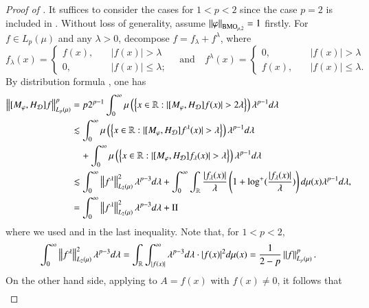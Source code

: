 \documentclass[leqno]{amsart}
\begin{document}
\begin{proof}[Proof of ]
 It suffices to consider the cases for $1<p<2$ since the case $p=2$ is included in . Without loss of generality, assume $\left\| \varphi \right\|_{{\rm BMO}_{\mu,2}}=1$ firstly. For $f\in L_{p}(\mu)$ and any $\lambda>0$, decompose $f=f_{\lambda}+f^{\lambda}$, where
\begin{equation*}
f_{\lambda}(x)=\left\{
\begin{aligned}
f(x),\quad&|f(x)|>\lambda\\
0,\quad&|f(x)|\leq\lambda;
\end{aligned}
\right.
\quad\mbox{and}\quad
f^{\lambda}(x)=\left\{
\begin{aligned}
0,\quad&|f(x)|>\lambda\\
f(x),\quad&|f(x)|\leq\lambda.
\end{aligned}
\right.
\end{equation*}
By distribution formula \cite[Proposition 1.1.4]{Gr-book1}, one has
\begin{align*}
\Norm{[M_{\varphi},H_{\D}]f}_{L_{p}(\mu)}^{p}
&=p2^{p-1}\int_{0}^{\infty}\mu\left(\set{x\in\RR:|[M_{\varphi},H_{\D}]f(x)|>2\lambda}\right)
\lambda^{p-1}d\lambda\\
&\lesssim\int_{0}^{\infty}\mu\left(\set{x\in\RR:|[M_{\varphi},H_{\D}]f^{\lambda}(x)|>\lambda}\right)
\lambda^{p-1}d\lambda\\
&\quad+\int_{0}^{\infty}\mu\left(\set{x\in\RR:|[M_{\varphi},H_{\D}]f_{\lambda}(x)|>\lambda}\right)
\lambda^{p-1}d\lambda\\
&\lesssim\int_{0}^{\infty}\Norm{f^{\lambda}}_{L_{2}(\mu)}^{2}\lambda^{p-3}d\lambda
+\int_{0}^{\infty}\int_{\RR}\frac{|f_{\lambda}(x)|}{\lambda}\left(1+\log^{+}(\frac{|f_{\lambda}(x)|}{\lambda})\right)
d\mu(x)\lambda^{p-1}d\lambda,
\\&=\int_{0}^{\infty}\Norm{f^{\lambda}}_{L_{2}(\mu)}^{2}\lambda^{p-3}d\lambda+\mathrm{II}
\end{align*}
where we used  and  in the last inequality.
Note that, for $1<p<2$,
\begin{align*}
\int_{0}^{\infty}\left\| f^{\lambda} \right\|_{L_{2}(\mu)}^{2}\lambda^{p-3}d\lambda
=\int_{{\mathbb R}}\int_{|f(x)|}^{\infty}\lambda^{p-3}d\lambda\cdot|f(x)|^{2}d\mu(x)
=\frac{1}{2-p}\left\| f \right\|_{L_{p}(\mu)}^{p}.
\end{align*}
On the other hand side, applying  to $A=f(x)$ with $f(x)\neq0$, it follows that
\begin{align*}

\end{align*}
\end{proof}
\end{document}
